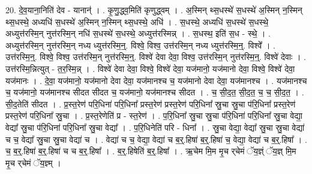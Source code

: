 \documentclass[17pt]{extarticle}
\begin{document}
20. दे॒व॒याना॒निति॑ देव - यानान्॑ । . कृ॒णु॒द्ध्व॒मिति॑ कृणुद्ध्वम् । . अ॒स्मिन् थ्स॒धस्थे॑ स॒धस्थे॑ अ॒स्मिन् न॒स्मिन् थ्स॒धस्थे॒ अध्यधि॑ स॒धस्थे॑ अ॒स्मिन् न॒स्मिन् थ्स॒धस्थे॒ अधि॑ । . स॒धस्थे॒ अध्यधि॑ स॒धस्थे॑ स॒धस्थे॒ अध्युत्त॑रस्मि॒न् नुत्त॑रस्मि॒न् नधि॑ स॒धस्थे॑ स॒धस्थे॒ अध्युत्त॑रस्मिन्न् । . स॒धस्थ॒ इति॑ स॒ध - स्थे॒ । . अध्युत्त॑रस्मि॒न् नुत्त॑रस्मि॒न् नध्य ध्युत्त॑रस्मि॒न्॒. विश्वे॒ विश्व॒ उत्त॑रस्मि॒न् नध्य ध्युत्त॑रस्मि॒न्॒. विश्वे᳚ । . उत्त॑रस्मि॒न्॒. विश्वे॒ विश्व॒ उत्त॑रस्मि॒न् नुत्त॑रस्मि॒न्॒. विश्वे॑ देवा देवा॒ विश्व॒ उत्त॑रस्मि॒न् नुत्त॑रस्मि॒न्॒. विश्वे॑ देवाः । . उत्त॑रस्मि॒न्नित्युत् - त॒र॒स्मि॒न्न् । . विश्वे॑ देवा देवा॒ विश्वे॒ विश्वे॑ देवा॒ यज॑मानो॒ यज॑मानो देवा॒ विश्वे॒ विश्वे॑ देवा॒ यज॑मानः । . दे॒वा॒ यज॑मानो॒ यज॑मानो देवा देवा॒ यज॑मानश्च च॒ यज॑मानो देवा देवा॒ यज॑मानश्च । . यज॑मानश्च च॒ यज॑मानो॒ यज॑मानश्च सीदत सीदत च॒ यज॑मानो॒ यज॑मानश्च सीदत । . च॒ सी॒द॒त॒ सी॒द॒त॒ च॒ च॒ सी॒द॒त॒ । . सी॒द॒तेति॑ सीदत । . प्र॒स्त॒रेण॑ परि॒धिना॑ परि॒धिना᳚ प्रस्त॒रेण॑ प्रस्त॒रेण॑ परि॒धिना᳚ स्रु॒चा स्रु॒चा प॑रि॒धिना᳚ प्रस्त॒रेण॑ प्रस्त॒रेण॑ परि॒धिना᳚ स्रु॒चा । . प्र॒स्त॒रेणेति॑ प्र - स्त॒रेण॑ । . प॒रि॒धिना᳚ स्रु॒चा स्रु॒चा प॑रि॒धिना॑ परि॒धिना᳚ स्रु॒चा वेद्या॒ वेद्या᳚ स्रु॒चा प॑रि॒धिना॑ परि॒धिना᳚ स्रु॒चा वेद्या᳚ । . प॒रि॒धिनेति॑ परि - धिना᳚ । . स्रु॒चा वेद्या॒ वेद्या᳚ स्रु॒चा स्रु॒चा वेद्या॑ च च॒ वेद्या᳚ स्रु॒चा स्रु॒चा वेद्या॑ च । . वेद्या॑ च च॒ वेद्या॒ वेद्या॑ च ब॒र्॒.हिषा॑ ब॒र्॒.हिषा॑ च॒ वेद्या॒ वेद्या॑ च ब॒र्॒.हिषा᳚ । . च॒ ब॒र्॒.हिषा॑ ब॒र्॒.हिषा॑ च च ब॒र्॒.हिषा᳚ । . ब॒र्॒.हिषेति॑ ब॒र्॒.हिषा᳚ । . ऋ॒चेम मि॒म मृ॒च र्‌चेमं ॅय॒ज्ञ्ं ॅय॒ज्ञ् मि॒म मृ॒च र्‌चेमं ॅय॒ज्ञ्म् । \newline
\end{document}
